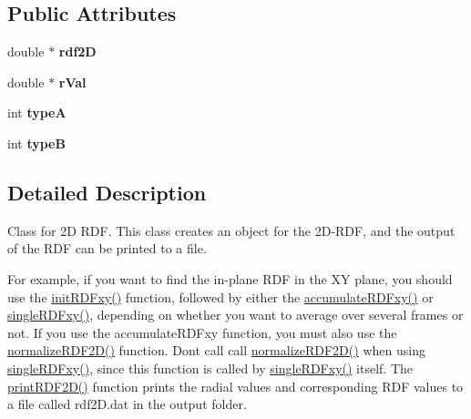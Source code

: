 \subsection*{Public Attributes}
\begin{DoxyCompactItemize}
\item 
\mbox{\label{classRdf2D_ad756caf75c389a69754105c70fb5db60}} 
double $\ast$ {\bfseries rdf2D}
\item 
\mbox{\label{classRdf2D_a3f7fdb2bb7ba36ff77f721c4abc8120a}} 
double $\ast$ {\bfseries r\+Val}
\item 
\mbox{\label{classRdf2D_a5720844aa069901d9e3b91a943af4ed8}} 
int {\bfseries typeA}
\item 
\mbox{\label{classRdf2D_ac4301eef0e368e8b67b6d03a152e0e8b}} 
int {\bfseries typeB}
\end{DoxyCompactItemize}


\subsection{Detailed Description}
Class for 2D R\+DF. This class creates an object for the 2D-\/\+R\+DF, and the output of the R\+DF can be printed to a file. 

For example, if you want to find the in-\/plane R\+DF in the XY plane, you should use the \mbox{\hyperlink{classRdf2D_a767f006de6412394a59f1cae5f7f6b35}{init\+R\+D\+Fxy()}} function, followed by either the \mbox{\hyperlink{classRdf2D_a6c716851d80fd2a7dcfefd219892d87b}{accumulate\+R\+D\+Fxy()}} or \mbox{\hyperlink{classRdf2D_afc5ff73aa9c126184e94ee3abfc14ff4}{single\+R\+D\+Fxy()}}, depending on whether you want to average over several frames or not. If you use the accumulate\+R\+D\+Fxy function, you must also use the \mbox{\hyperlink{classRdf2D_aaf6d00ec728e8c694ed2932332691c0d}{normalize\+R\+D\+F2\+D()}} function. Don\textquotesingle{}t call call \mbox{\hyperlink{classRdf2D_aaf6d00ec728e8c694ed2932332691c0d}{normalize\+R\+D\+F2\+D()}} when using \mbox{\hyperlink{classRdf2D_afc5ff73aa9c126184e94ee3abfc14ff4}{single\+R\+D\+Fxy()}}, since this function is called by \mbox{\hyperlink{classRdf2D_afc5ff73aa9c126184e94ee3abfc14ff4}{single\+R\+D\+Fxy()}} itself. The \mbox{\hyperlink{classRdf2D_aae00c1526117f6ac63d2c13354b6c404}{print\+R\+D\+F2\+D()}} function prints the radial values and corresponding R\+DF values to a file called rdf2\+D.\+dat in the output folder.

